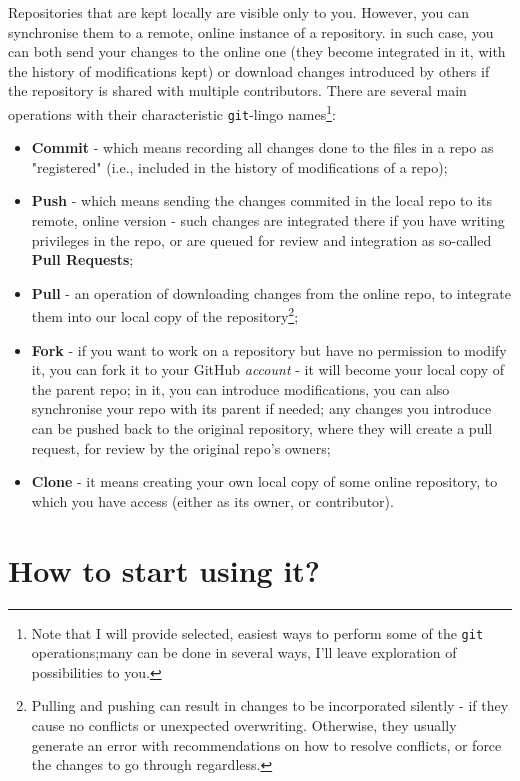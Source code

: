 \documentclass{tufte-handout}
\begin{document}
Repositories that are kept locally are visible only to you. However, you can synchronise them to a remote, online instance of a repository. in such case, you can both send your changes to the online one (they become integrated in it, with the history of modifications kept) or download changes introduced by others if the repository is shared with multiple contributors. There are several main operations with their characteristic \texttt{git}-lingo names\footnote{Note that I will provide selected, easiest ways to perform some of the \texttt{git} operations;many can be done in several ways, I'll leave exploration of possibilities to you.}:
\begin{itemize}
    \item \textbf{Commit} - which means recording all changes done to the files in a repo as "registered" (i.e., included in the history of modifications of a repo);
    \item \textbf{Push} - which means sending the changes commited in the local repo to its remote, online version - such changes are integrated there if you have writing privileges in the repo, or are queued for review and integration as so-called \textbf{Pull Requests};
    \item \textbf{Pull} - an operation of downloading changes from the online repo, to integrate them into our local copy of the repository\footnote{Pulling and pushing can result in changes to be incorporated silently - if they cause no conflicts or unexpected overwriting. Otherwise, they usually generate an error with recommendations on how to resolve conflicts, or force the changes to go through regardless.};
    \item \textbf{Fork} - if you want to work on a repository but have no permission to modify it, you can fork it to your GitHub \textit{account} - it will become your local copy of the parent repo; in it, you can introduce modifications, you can also synchronise your repo with its parent if needed; any changes you introduce can be pushed back to the original repository, where they will create a pull request, for review by the original repo's owners;
    \item \textbf{Clone} - it means creating your own local copy of some online repository, to which you have access (either as its owner, or contributor).
\end{itemize}

\section{How to start using it?}
\end{document}
